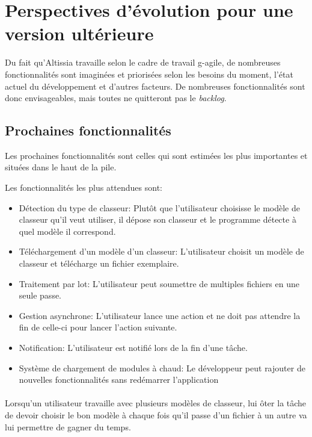 \section{Perspectives d'évolution pour une version ultérieure}
\label{sec:future-release-outlook}

Du fait qu’Altissia travaille selon le cadre de travail \Gls{g-agile}, de nombreuses fonctionnalités sont imaginées et priorisées selon les besoins du moment, l'état actuel du développement et d'autres facteurs.
De nombreuses fonctionnalités sont donc envisageables, mais toutes ne quitteront pas le \textit{backlog}\fnmark{}.

\subsection{Prochaines fonctionnalités}
\label{subsec:next-features}

Les prochaines fonctionnalités sont celles qui sont estimées les plus importantes et situées dans le haut de la pile.

Les fonctionnalités les plus attendues sont:
\begin{itemize}
    \item Détection du type de classeur: Plutôt que l'utilisateur choisisse le modèle de classeur qu'il veut utiliser, il dépose son classeur et le programme détecte à quel modèle il correspond.
    \item Téléchargement d'un modèle d'un classeur: L'utilisateur choisit un modèle de classeur et télécharge un fichier exemplaire.
    \item Traitement par lot: L'utilisateur peut soumettre de multiples fichiers en une seule passe.
    \item Gestion asynchrone: L'utilisateur lance une action et ne doit pas attendre la fin de celle-ci pour lancer l'action suivante.
    \item Notification: L'utilisateur est notifié lors de la fin d'une tâche.
    \item Système de chargement de modules à chaud: Le développeur peut rajouter de nouvelles fonctionnalités sans redémarrer l'application
\end{itemize}

\paragraph{}
Lorsqu'un utilisateur travaille avec plusieurs modèles de classeur, lui ôter la tâche de devoir choisir le bon modèle à chaque fois qu'il passe d'un fichier à un autre va lui permettre de gagner du temps.

